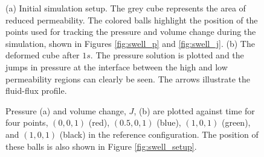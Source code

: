 \begin{figure}[H]
  \centering
  \caption{(a) Initial simulation setup. The grey cube represents the area of reduced permeability. The colored balls highlight the position of the points used for tracking the pressure and volume change during the simulation, shown in Figures \ref{fig:swell_p} and \ref{fig:swell_j}. (b) The deformed cube after $1s$. The pressure solution is plotted and the jumps in pressure at the interface between the high and low permeability regions can clearly be seen. The arrows illustrate the fluid-flux profile. \label{fig:animals_two} }

\end{figure}

\begin{table}[h]
\begin{center}
\end{center}
\caption{Parameters used for the swelling test problem. \label{tab:parameters}}
\end{table}

\begin{figure}[H]
  \centering
\caption{ Pressure (a) and volume change, $J$, (b) are plotted against time for four points, $(0,0,1)$ (red), $(0.5,0,1)$ (blue), $(1,0,1)$ (green), and $(1,0,1)$ (black) in the reference configuration. The position of these balls is also shown in Figure \ref{fig:swell_setup}. \label{fig:animals_three} }
\end{figure}


